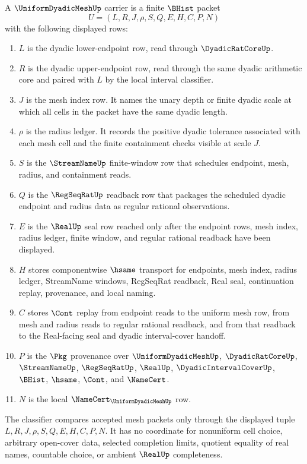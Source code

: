 \begin{definition}
\label{def:uniform-dyadic-mesh-carrier}
A $\UniformDyadicMeshUp$ carrier is a finite $\BHist$ packet
$$
U=(L,R,J,\rho,S,Q,E,H,C,P,N)
$$
with the following displayed rows:
\begin{enumerate}
\item $L$ is the dyadic lower-endpoint row, read through $\DyadicRatCoreUp$.
\item $R$ is the dyadic upper-endpoint row, read through the same dyadic arithmetic core and paired with $L$ by the local interval classifier.
\item $J$ is the mesh index row. It names the unary depth or finite dyadic scale at which all cells in the packet have the same dyadic length.
\item $\rho$ is the radius ledger. It records the positive dyadic tolerance associated with each mesh cell and the finite containment checks visible at scale $J$.
\item $S$ is the $\StreamNameUp$ finite-window row that schedules endpoint, mesh, radius, and containment reads.
\item $Q$ is the $\RegSeqRatUp$ readback row that packages the scheduled dyadic endpoint and radius data as regular rational observations.
\item $E$ is the $\RealUp$ seal row reached only after the endpoint rows, mesh index, radius ledger, finite window, and regular rational readback have been displayed.
\item $H$ stores componentwise $\hsame$ transport for endpoints, mesh index, radius ledger, StreamName windows, RegSeqRat readback, Real seal, continuation replay, provenance, and local naming.
\item $C$ stores $\Cont$ replay from endpoint reads to the uniform mesh row, from mesh and radius reads to regular rational readback, and from that readback to the Real-facing seal and dyadic interval-cover handoff.
\item $P$ is the $\Pkg$ provenance over $\UniformDyadicMeshUp$, $\DyadicRatCoreUp$, $\StreamNameUp$, $\RegSeqRatUp$, $\RealUp$, $\DyadicIntervalCoverUp$, $\BHist$, $\hsame$, $\Cont$, and $\NameCert$.
\item $N$ is the local $\NameCert_{\UniformDyadicMeshUp}$ row.
\end{enumerate}
The classifier compares accepted mesh packets only through the displayed tuple $L,R,J,\rho,S,Q,E,H,C,P,N$. It has no coordinate for nonuniform cell choice, arbitrary open-cover data, selected completion limits, quotient equality of real names, countable choice, or ambient $\RealUp$ completeness.
\end{definition}

